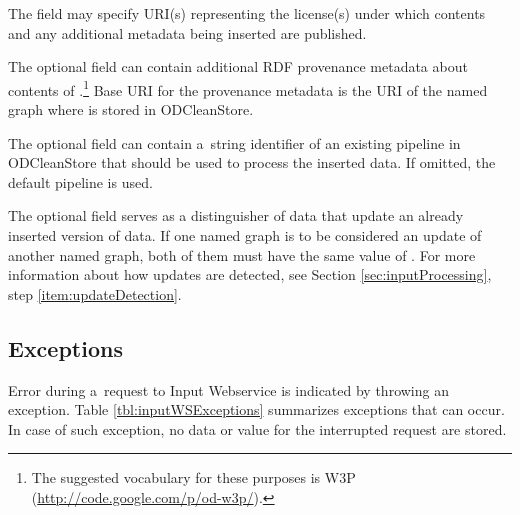 {The  field may specify URI(s) representing the license(s) under which  contents and any additional  metadata being inserted are published. 

The optional  field can contain additional RDF provenance metadata about contents of .\footnote{The suggested vocabulary for these purposes is W3P (\url{http://code.google.com/p/od-w3p/}).} Base URI for the provenance metadata is the URI of the named graph where  is stored in ODCleanStore.

The optional  field can contain a~string identifier of an existing pipeline in ODCleanStore that should be used to process the inserted data. If omitted, the default pipeline is used. 

The optional  field serves as a distinguisher of data that update an already inserted version of data. If one named graph is to be considered an update of another named graph, both of them must have the same value of . For more information about how updates are detected, see Section \ref{sec:inputProcessing}, step \ref{item:updateDetection}.

\subsection{Exceptions}

Error during a~request to Input Webservice is indicated by throwing an exception. Table \ref{tbl:inputWSExceptions} summarizes exceptions that can occur. In case of such exception, no data or  value for the interrupted request are stored.


}
